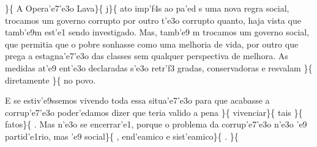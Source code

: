  \ltrch{}  \par \}\{\rtlch{}
 \ltrch{}  \tab A Opera'e7'e3o
Lava\}\{\rtlch{}  \ltrch{}  j\}\{\rtlch{}
 \ltrch{}  ato imp'f4s ao pa'ed s
uma nova regra social, trocamos um governo corrupto por outro t'e3o
corrupto quanto, haja vista que tamb'e9m est'e1 sendo investigado. Mas,
tamb'e9 m trocamos um governo social, que permitia que o pobre sonhasse
como uma melhoria de vida, por outro que prega a estagna'e7'e3o das
classes sem qualquer perspectiva de melhora. As medidas at'e9 ent'e3o
declaradas s'e3o retr'f3 gradas, conservadoras e resvalam
\}\{\rtlch{}  \ltrch{}  diretamente
\}\{\rtlch{}  \ltrch{}  no
povo. \par \tab E se estiv'e9ssemos vivendo toda essa situa'e7'e3o para
que acabasse a corrup'e7'e3o poder'edamos dizer que teria valido a pena
\}\{\rtlch{}  \ltrch{} 
vivenciar\}\{\rtlch{}  \ltrch{}
 tais \}\{\rtlch{}  \ltrch{}
 fatos\}\{\rtlch{}  \ltrch{}
 . Mas n'e3o se encerrar'e1, porque o
problema da corrup'e7'e3o n'e3o 'e9 partid'e1rio, mas 'e9
social\}\{\rtlch{}  \ltrch{} 
, end'eamico e sist'eamico\}\{\rtlch{}  \ltrch{}
 . \}\{\rtlch{}  \ltrch{}
